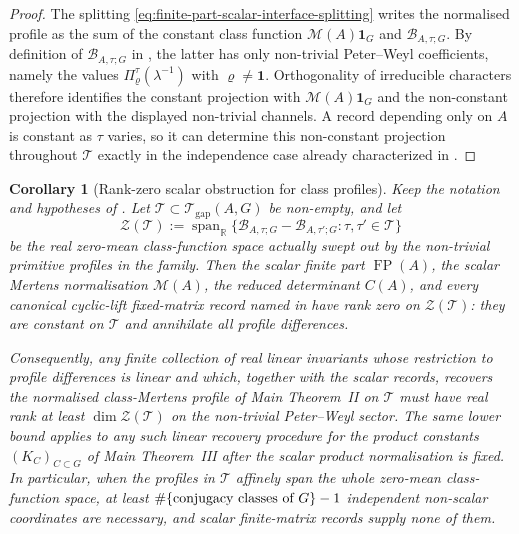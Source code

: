 \documentclass[11pt,a4paper]{amsart}
\theoremstyle{plain}
\newtheorem{corollary}[theorem]{Corollary}
\theoremstyle{definition}
\theoremstyle{remark}
\DeclareMathOperator{\FP}{FP}
\begin{document}
\begin{proof}
  The splitting
  \eqref{eq:finite-part-scalar-interface-splitting} writes the normalised
  profile as the sum of the constant class function
  \(\mathcal M(A)\mathbf1_G\) and
  \(\mathcal B_{A,\tau;G}\).  By definition of
  \(\mathcal B_{A,\tau;G}\) in
  , the latter has only
  non-trivial Peter--Weyl coefficients, namely the values
  \(\Pi_\varrho^\tau(\lambda^{-1})\) with
  \(\varrho\neq\mathbf1\).  Orthogonality of irreducible characters
  therefore identifies the constant projection with
  \(\mathcal M(A)\mathbf1_G\) and the non-constant projection with the
  displayed non-trivial channels.  A record depending only on \(A\) is
  constant as \(\tau\) varies, so it can determine this non-constant
  projection throughout \(\mathscr T\) exactly in the independence case
  already characterized in
  .
\end{proof}

\begin{corollary}[Rank-zero scalar obstruction for class profiles]
  \label{cor:scalar-record-rank-zero-bound}
  Keep the notation and hypotheses of
  .  Let
  \(\mathscr T\subset\mathcal T_{\mathrm{gap}}(A,G)\) be non-empty, and let
  \[
    \mathcal Z(\mathscr T)
    :=
    \operatorname{span}_{\mathbb{R}}
    \{\mathcal B_{A,\tau;G}-\mathcal B_{A,\tau';G}:
        \tau,\tau'\in\mathscr T\}
  \]
  be the real zero-mean class-function space actually swept out by the
  non-trivial primitive profiles in the family.  Then the scalar finite part
  \(\FP(A)\), the scalar Mertens normalisation \(\mathcal M(A)\), the reduced
  determinant \(C(A)\), and every canonical cyclic-lift fixed-matrix record
  named in  have rank zero on
  \(\mathcal Z(\mathscr T)\): they are constant on \(\mathscr T\) and
  annihilate all profile differences.

  Consequently, any finite collection of real linear invariants whose restriction
  to profile differences is linear and which, together with the scalar
  records, recovers the normalised class-Mertens profile of Main Theorem~II on
  \(\mathscr T\) must have real rank at least
  \(\dim\mathcal Z(\mathscr T)\) on the non-trivial Peter--Weyl sector.  The
  same lower bound applies to any such linear recovery procedure for the
  product constants \((K_C)_{C\subset G}\) of Main Theorem~III after the scalar
  product normalisation is fixed.  In particular, when the profiles in
  \(\mathscr T\) affinely span the
  whole zero-mean class-function space, at least
  \(\#\{\textup{conjugacy classes of }G\}-1\) independent non-scalar
  coordinates are necessary, and scalar finite-matrix records supply none of
  them.
\end{corollary}
\end{document}
